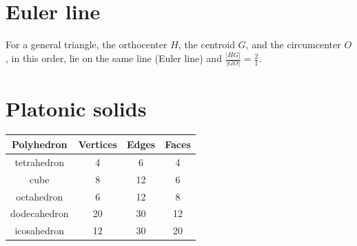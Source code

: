\section*{Euler line}
For a general triangle, the orthocenter $H$, the centroid $G$, 
and the circumcenter $O$, in this order, lie on the same line (Euler line) 
and $\frac{|HG|}{|GO|} = \frac{2}{1}$.

\section*{Platonic solids}
\begin{tabular}{ |c|c|c|c| } 
\hline
Polyhedron & Vertices & Edges & Faces \\ 
\hline
tetrahedron & 4 & 6 & 4 \\ 
\hline
cube & 8 & 12 & 6 \\ 
\hline
octahedron & 6 & 12 & 8 \\
\hline
dodecahedron & 20 & 30 & 12 \\
\hline
icosahedron & 12 & 30 & 20 \\
\hline
\end{tabular}
 
